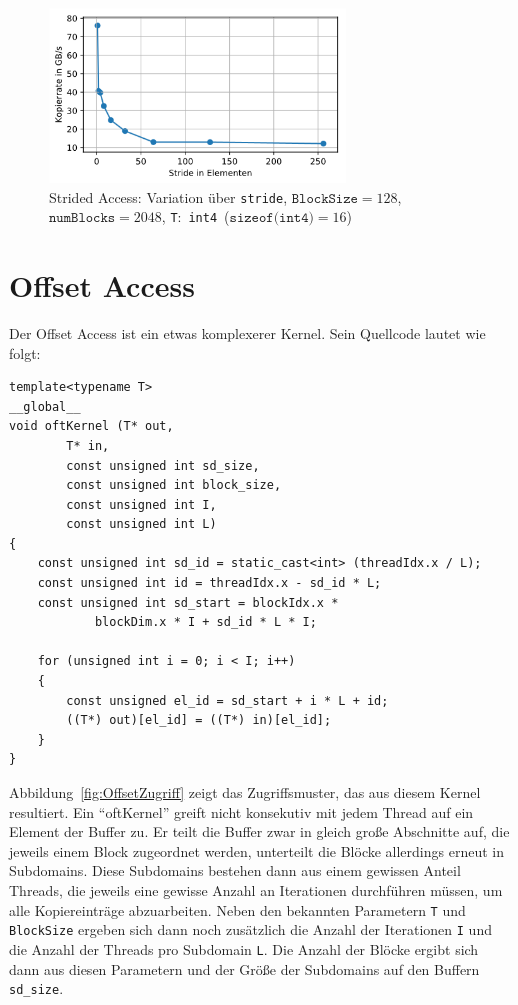 \documentclass[11pt, abstract=on]{scrartcl}
\begin{document}
\begin{figure} [htbp]
 	\centering
 		\includegraphics[width=0.7\textwidth]{Graph_StridedAccess2.png}
 	 	\caption{Strided Access: Variation über \texttt{stride}, $\texttt{BlockSize} = 128$, $\texttt{numBlocks} = 2048$, \texttt{T}:~\texttt{int4}~($\texttt{sizeof(int4)} = 16$)}
 	\label{fig:StridedAccess2}
\end{figure}

\section{Offset Access}

Der Offset Access ist ein etwas komplexerer Kernel. Sein Quellcode lautet wie folgt:

\begin{lstlisting} 
template<typename T>
__global__
void oftKernel (T* out,
		T* in,
		const unsigned int sd_size,
		const unsigned int block_size,
		const unsigned int I,
		const unsigned int L)
{
	const unsigned int sd_id = static_cast<int> (threadIdx.x / L);
	const unsigned int id = threadIdx.x - sd_id * L;
	const unsigned int sd_start = blockIdx.x *
			blockDim.x * I + sd_id * L * I;
	
	for (unsigned int i = 0; i < I; i++)
	{
		const unsigned el_id = sd_start + i * L + id;
		((T*) out)[el_id] = ((T*) in)[el_id];
	}
}
\end{lstlisting}

Abbildung~\ref{fig:OffsetZugriff} zeigt das Zugriffsmuster, das aus diesem Kernel resultiert. Ein "`oftKernel"' greift nicht konsekutiv mit jedem Thread auf ein Element der Buffer zu. Er teilt die Buffer zwar in gleich große Abschnitte auf, die jeweils einem Block zugeordnet werden, unterteilt die Blöcke allerdings erneut in Subdomains. Diese Subdomains bestehen dann aus einem gewissen Anteil Threads, die jeweils eine gewisse Anzahl an Iterationen durchführen müssen, um alle Kopiereinträge abzuarbeiten. Neben den bekannten Parametern \texttt{T} und \texttt{BlockSize} ergeben sich dann noch zusätzlich die Anzahl der Iterationen \texttt{I} und die Anzahl der Threads pro Subdomain \texttt{L}. Die Anzahl der Blöcke ergibt sich dann aus diesen Parametern und der Größe der Subdomains auf den Buffern \texttt{sd\_size}.
\end{document}
